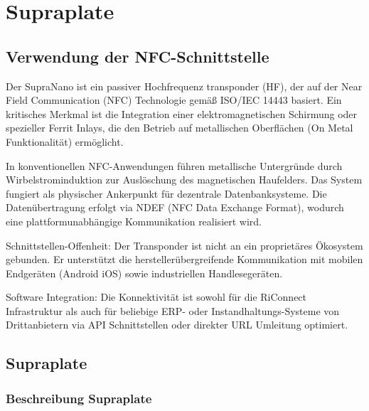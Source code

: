 %
%
%


\chapter{Supraplate}

\section{Verwendung der NFC-Schnittstelle}
Der SupraNano ist ein passiver Hochfrequenz transponder (HF), der auf der Near Field Communication (NFC) Technologie gemäß ISO/IEC 14443 basiert. Ein kritisches Merkmal ist die Integration einer elektromagnetischen Schirmung oder spezieller Ferrit Inlays, die den Betrieb auf metallischen Oberflächen (On Metal Funktionalität) ermöglicht.

In konventionellen NFC-Anwendungen führen metallische Untergründe durch Wirbelstrominduktion zur Auslöschung des magnetischen Haufelders.
Das System fungiert als physischer Ankerpunkt für dezentrale Datenbanksysteme. Die Datenübertragung erfolgt via NDEF (NFC Data Exchange Format), wodurch eine plattformunabhängige Kommunikation realisiert wird. \cite{yoke:2025}
\begin{itemize}{
 \item Schnittstellen-Offenheit: Der Transponder ist nicht an ein proprietäres Ökosystem gebunden. Er unterstützt die herstellerübergreifende Kommunikation mit mobilen Endgeräten (Android iOS) sowie industriellen Handlesegeräten.

\item Software Integration: Die Konnektivität ist sowohl für die RiConnect Infrastruktur als auch für beliebige ERP- oder Instandhaltungs-Systeme von Drittanbietern via API Schnittstellen oder direkter URL Umleitung optimiert. \cite{yoke:2025}
} \end{itemize}


\section{Supraplate}

\subsection{Beschreibung Supraplate}


